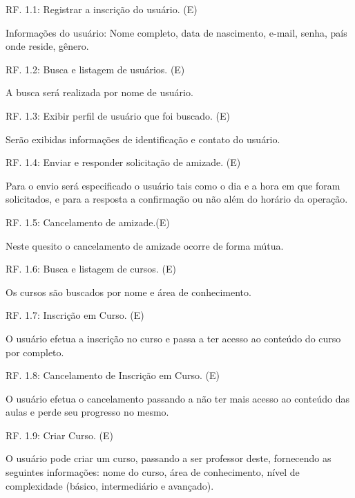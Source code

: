 \documentclass[12pt,a4paper,onecolumn,titlepage]{article}
\begin{document}
\begin{description}


\item RF. 1.1: Registrar a inscrição do usuário. (E)
\item \qquad Informações do usuário: Nome completo, data de nascimento, e-mail, senha, país onde reside, gênero.

\item RF. 1.2: Busca e listagem de usuários. (E)
\item \qquad A busca será realizada por nome de usuário.

\item RF. 1.3: Exibir perfil de usuário que foi buscado. (E)
\item \qquad Serão exibidas informações de identificação e contato do usuário.

\item RF. 1.4: Enviar e responder solicitação de amizade. (E)
\item \qquad Para o envio será especificado o usuário tais como o dia e a hora em que foram solicitados, e para a resposta a confirmação ou não além do horário da operação.

\item RF. 1.5: Cancelamento de amizade.(E)
\item \qquad Neste quesito o cancelamento de amizade ocorre de forma mútua.

\item RF. 1.6: Busca e listagem de cursos. (E)
\item \qquad Os cursos são buscados por nome e área de conhecimento.
 
\item RF. 1.7: Inscrição em Curso. (E)
\item \qquad O usuário efetua a inscrição no curso e passa a ter acesso ao conteúdo do curso por completo.

\item RF. 1.8: Cancelamento de Inscrição em Curso. (E)
\item \qquad O usuário efetua o cancelamento passando a não ter mais acesso ao conteúdo das aulas e perde seu progresso no mesmo.

\item RF. 1.9: Criar Curso. (E)
\item \qquad O usuário pode criar um curso, passando a ser professor deste, fornecendo as seguintes informações: nome do curso, área de conhecimento, nível de complexidade (básico, intermediário e avançado).


\end{description}
\end{document}
